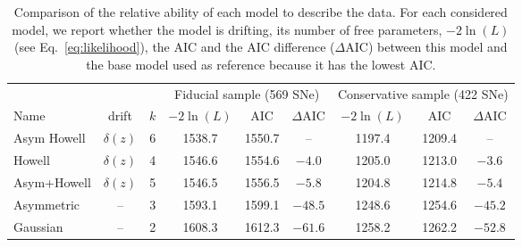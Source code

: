 \documentclass[]{aa}
\begin{document}
\begin{table}
    \centering
    \caption{Comparison of the relative ability of each model to describe the
        data. For each considered model, we report whether the model is
        drifting, its number of free parameters, $-2\ln(L)$ (see
        Eq.~\ref{eq:likelihood}), the AIC and the AIC difference ($\Delta$AIC)
        between this model and the base model used as reference because it has
    the lowest AIC.}
    \label{tab:modelcomp}
    \begin{tabular}{lcccccccc}
        \toprule
        & & & \multicolumn{3}{c}{Fiducial sample (569 SNe)}
            & \multicolumn{3}{c}{Conservative sample (422 SNe)} \\
        \cmidrule(lr){4-6}\cmidrule(lr){7-9}
        Name & drift & $k$ &
        $-2\ln(L)$ & AIC & $\Delta$AIC & $-2\ln(L)$ & AIC & $\Delta$AIC\\[0.2em]
        \midrule

        Asym Howell & $\delta(z)$ & 6
        & 1538.7 & 1550.7 & -- 
        & 1197.4 & 1209.4 & -- \\

        Howell & $\delta(z)$ & 4
        & 1546.6 & 1554.6 & $-4.0$
        & 1205.0 & 1213.0 & $-3.6$ 
        \\

        Asym+Howell & $\delta(z)$ & 5
        & 1546.5 & 1556.5 & $-5.8$
        & 1204.8 & 1214.8 & $-5.4$ 
        \\

        Asymmetric & -- & 3
        & 1593.1 & 1599.1 & $-48.5$
        & 1248.6 & 1254.6 & $-45.2$ 
        \\

        Gaussian & -- & 2
        & 1608.3 & 1612.3 & $-61.6$
        & 1258.2 & 1262.2 & $-52.8$ 
        \\
        \bottomrule
    \end{tabular}
\end{table}
\end{document}
